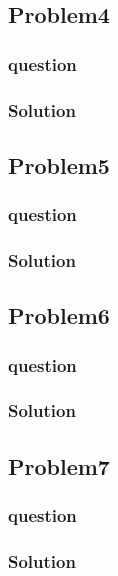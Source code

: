 \documentclass[journal,12pt,twocolumn]{IEEEtran}
\begin{document}
\subsection{Problem4}
\subsubsection{question}

\subsubsection{Solution}


\subsection{Problem5}
\subsubsection{question}

\subsubsection{Solution}


\subsection{Problem6}
\subsubsection{question}

\subsubsection{Solution}


\subsection{Problem7}
\subsubsection{question}

\subsubsection{Solution}

\end{document}
